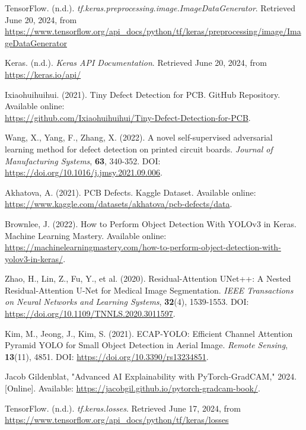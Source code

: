 \documentclass[12pt]{article}
\begin{document}
\begin{thebibliography}{10}
    TensorFlow. (n.d.). \textit{tf.keras.preprocessing.image.ImageDataGenerator}. Retrieved June 20, 2024, from \url{https://www.tensorflow.org/api_docs/python/tf/keras/preprocessing/image/ImageDataGenerator}

    Keras. (n.d.). \textit{Keras API Documentation}. Retrieved June 20, 2024, from \url{https://keras.io/api/}
    
    Ixiaohuihuihui. (2021). Tiny Defect Detection for PCB. GitHub Repository. Available online: \\\url{https://github.com/Ixiaohuihuihui/Tiny-Defect-Detection-for-PCB}.
    
    Wang, X., Yang, F., Zhang, X. (2022). A novel self-supervised adversarial learning method for defect detection on printed circuit boards. \textit{Journal of Manufacturing Systems}, \textbf{63}, 340-352. DOI: \url{https://doi.org/10.1016/j.jmsy.2021.09.006}.
    
    Akhatova, A. (2021). PCB Defects. Kaggle Dataset. Available online: \url{https://www.kaggle.com/datasets/akhatova/pcb-defects/data}.
    
    Brownlee, J. (2022). How to Perform Object Detection With YOLOv3 in Keras. Machine Learning Mastery. Available online: \url{https://machinelearningmastery.com/how-to-perform-object-detection-with-yolov3-in-keras/}.
    
    Zhao, H., Lin, Z., Fu, Y., et al. (2020). Residual-Attention UNet++: A Nested Residual-Attention U-Net for Medical Image Segmentation. \textit{IEEE Transactions on Neural Networks and Learning Systems}, \textbf{32}(4), 1539-1553. DOI: \url{https://doi.org/10.1109/TNNLS.2020.3011597}.

    Kim, M., Jeong, J., Kim, S. (2021). ECAP-YOLO: Efficient Channel Attention Pyramid YOLO for Small Object Detection in Aerial Image. \textit{Remote Sensing}, \textbf{13}(11), 4851. DOI: \url{https://doi.org/10.3390/rs13234851}.

    Jacob Gildenblat, "Advanced AI Explainability with PyTorch-GradCAM," 2024. [Online]. Available: \url{https://jacobgil.github.io/pytorch-gradcam-book/}.

    TensorFlow. (n.d.). \textit{tf.keras.losses}. Retrieved June 17, 2024, from \url{https://www.tensorflow.org/api_docs/python/tf/keras/losses}
       
\end{thebibliography}

\clearpage
\newpage

\listoffigures

\clearpage
\newpage
\end{document}
